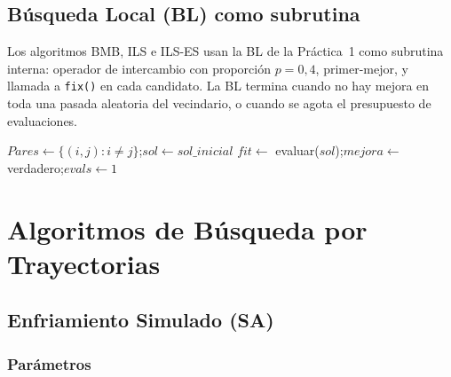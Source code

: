 \documentclass[12pt,a4paper]{article}
\begin{document}
\subsection{Búsqueda Local (BL) como subrutina}

Los algoritmos BMB, ILS e ILS-ES usan la BL de la Práctica~1 como subrutina interna:
operador de intercambio con proporción $p=0{,}4$, primer-mejor, y llamada a \texttt{fix()}
en cada candidato. La BL termina cuando no hay mejora en toda una pasada aleatoria del
vecindario, o cuando se agota el presupuesto de evaluaciones.

\begin{algorithm}[H]
\caption{BL($sol\_inicial$, problema, maxEvals)}
$Pares \leftarrow \{(i,j): i\ne j\}$;\quad $sol \leftarrow sol\_inicial$\;
$fit \leftarrow$ evaluar($sol$);\quad $mejora \leftarrow$ verdadero;\quad $evals \leftarrow 1$\;
\end{algorithm}

\section{Algoritmos de Búsqueda por Trayectorias}

\subsection{Enfriamiento Simulado (SA)}

\subsubsection*{Parámetros}
\end{document}
